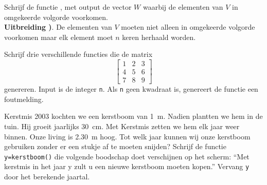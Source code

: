 \begin{oef}
Schrijf de functie , met output de vector $W$ 
waarbij de elementen van $V$ in omgekeerde volgorde voorkomen.\\
\textbf{Uitbreiding  )}. De elementen van $V$ 
moeten niet alleen in omgekeerde volgorde voorkomen maar elk element 
moet $n$ keren herhaald worden.
\end{oef}

\begin{oef}
Schrijf drie verschillende functies die de matrix 
\begin{equation*}
\begin{bmatrix}
 1&2  &3  \\
 4& 5 &6 \\
 7& 8 &9
\end{bmatrix}
\end{equation*}
genereren. Input is de integer \verb+n+. Als \verb+n+ geen kwadraat is, genereert de functie een foutmelding.
\end{oef}

\begin{oef}
Kerstmis 2003 kochten we een kerstboom van \SI{1}{\meter}. Nadien plantten we hem in de tuin. Hij groeit jaarlijks \SI{30}{\centi\meter}. Met Kerstmis zetten we hem elk jaar weer binnen. Onze living is \SI{2,30}{\meter} hoog. Tot welk jaar kunnen wij onze kerstboom gebruiken zonder er een stukje af te moeten snijden? Schrijf de functie \verb/y=kerstboom()/ die volgende boodschap doet verschijnen op het scherm: ``Met kerstmis in het jaar y zult u een nieuwe kerstboom moeten kopen.'' Vervang \verb/y/ door het berekende jaartal.
\end{oef}



